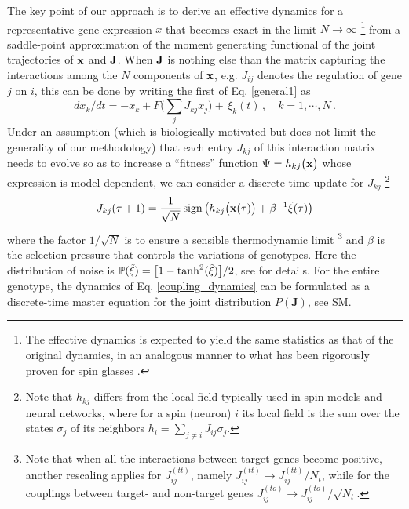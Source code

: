 \documentclass[%
 reprint,
superscriptaddress,
 amsmath,amssymb,
 prl,
]{revtex4-2}
\newcommand{\re}{\color{red}} %
\begin{document}
The key point of our approach is to derive an effective dynamics for a representative  gene  expression $x$ that becomes exact in the  limit $N\rightarrow \infty$ \footnote{
 The effective dynamics is expected to yield the same statistics as that of the original dynamics,
in an analogous manner to what has been rigorously proven for spin glasses \cite{BenArous2006}.} %
from a saddle-point approximation of the  moment generating functional of the joint trajectories of $\bold{x}$ and $\bold{J}$. When $\bold{J}$ is nothing else than the matrix capturing the interactions among the $N$ components  of $\bold{x}$, e.g. $J_{ij}$ denotes the regulation of gene $j$ on $i$, this can be done by writing the first of Eq. \eqref{general1} as
\begin{equation*}
   dx_k/dt = - x_k + F\Big(\sum_{j} J_{kj} x_j\Big) +\, \xi_k(t) \,,\quad k=1,\cdots, N\,.
     \label{general2}
\end{equation*}
Under an assumption (which is biologically motivated but does not limit the generality of our methodology) that each entry $J_{kj}$  of this interaction matrix needs to evolve so as to increase a  ``fitness'' function $\Psi = h_{kj}\big(\bold{x}\big)$ whose expression is model-dependent, we can %
consider  a discrete-time update %
for $J_{kj}$ \footnote{Note that $h_{kj}$ differs from the local field typically used in spin-models and neural networks, where for a spin (neuron) $i$ its local field is the sum over the states $\sigma_j$  of its neighbors $h_i = \sum_{j\neq i} J_{ij}\sigma_j$.}
\begin{equation}J_{kj}(\tau+1)= \frac{1}{\sqrt{N}}\,{\rm sign}\,\big(h_{kj}\big(\mathbf{x}(\tau)\big) + \beta^{-1}\tilde{\xi}(\tau)\big) 
\label{coupling_dynamics}
  \end{equation} 
 where the factor $1/\sqrt{N}$ is to ensure a sensible thermodynamic limit \footnote{Note that  when all the interactions between target genes become positive, another rescaling applies for $J_{ij}^{(tt)}$, namely $ J_{ij}^{(tt)} \rightarrow J_{ij}^{(tt)}/N_t$, while for the couplings between target- and non-target genes $ J_{ij}^{(to)} \rightarrow J_{ij}^{(to)}/\sqrt{N_t}$.} and  $\beta$ is the selection pressure that controls the variations of genotypes.   Here the distribution of noise is $\mathbb{P}(\tilde{\xi}) = \big[1- {\rm tanh}^2(\tilde{\xi})\big]/2$, see \cite{COOLEN2001} for details.
 For 
 the entire genotype,  the dynamics of Eq. \eqref{coupling_dynamics} can be formulated as a discrete-time  master equation for the joint distribution  $P(\mathbf{J})$, see SM.
\end{document}
